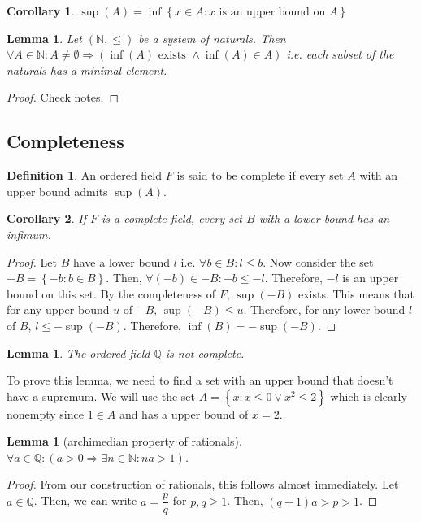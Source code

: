\documentclass{article}
\newcommand\N{\ensuremath{\mathbb{N}}}
\renewcommand\O{\ensuremath{\emptyset}}
\newcommand\Q{\ensuremath{\mathbb{Q}}}
\newtheorem{corollary}{Corollary}[theorem]
\newtheorem{lemma}[theorem]{Lemma}
\theoremstyle{definition}
\newtheorem{definition}{Definition}[subsection]
\theoremstyle{remark}
\theoremstyle{plain}
\begin{document}
\begin{corollary}
    \(\sup(A) = \inf\left\{ x \in A: x \text{ is an upper bound on } A \right\}\)
\end{corollary}

\begin{lemma}
    Let \((\N, \leq)\) be a system of naturals. Then \(\forall A \in \N: A \neq \O \Rightarrow (\inf(A) \text{ exists } \land \inf(A) \in A)\) i.e. each subset of the naturals
    has a minimal element.
\end{lemma}

\begin{proof}
    Check notes.
\end{proof}

\subsection{Completeness}

\begin{definition}
    An ordered field \(F\) is said to be complete if every set \(A\) with an upper bound admits 
    \(\sup(A)\).
\end{definition}

\begin{corollary}
    If \(F\) is a complete field, every set \(B\) with a lower bound has an infimum. 
\end{corollary}
\begin{proof}
    Let \(B\) have a lower bound \(l\) i.e. \(\forall b \in B: l \leq b\). 
    Now consider the set \(-B = \left\{ -b: b \in B \right\}\). Then, 
    \(\forall (-b) \in -B: -b \leq -l\). Therefore, \(-l\) is an upper bound on this set. 
    By the completeness of \(F\), \(\sup(-B)\) exists. This means that for any upper bound \(u\)
    of \(-B\), \(\sup(-B) \leq u\). Therefore, for any lower bound \(l\) of \(B\), 
    \( l \leq -\sup(-B)\). Therefore, \(\inf(B) = -\sup(-B)\).
\end{proof}

\begin{lemma}
    The ordered field \(\Q\) is not complete.
\end{lemma}

To prove this lemma, we need to find a set with an upper bound
that doesn't have a supremum. We will use the set \(A = \left\{ x: x \leq 0 \lor x^2 \leq 2 \right\}\)
which is clearly nonempty since \(1 \in A\) and has a upper bound of \(x=2\). 

\begin{lemma}[archimedian property of rationals]
    \(\forall a \in \Q: (a > 0 \Rightarrow \exists n \in \N : na > 1)\).
\end{lemma}
\begin{proof}
    From our construction of rationals, this follows almost immediately. 
    Let \(a \in \Q\). Then, we can write \(a = \dfrac{p}{q}\) for \(p,q \geq 1\).
    Then, \((q+1)a > p > 1\). 
\end{proof}
\end{document}
